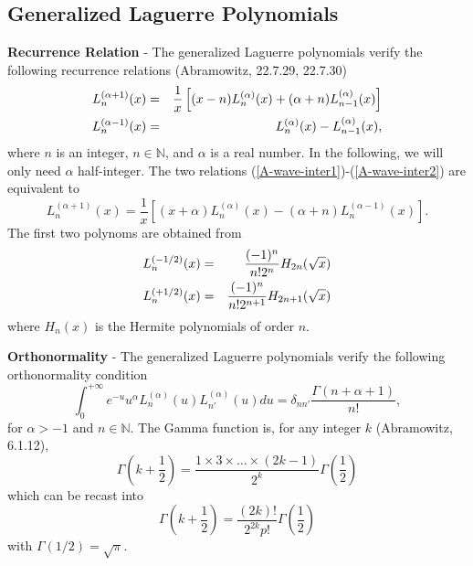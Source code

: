 \documentclass[letterpaper,12pt]{article}
\begin{document}
\subsection{Generalized Laguerre Polynomials}

{\bf Recurrence Relation} - The generalized Laguerre polynomials verify the
following recurrence relations (Abramowitz, 22.7.29, 22.7.30)
\begin{eqnarray}
\displaystyle L_{n}^{(\alpha +1)}(x) & = &
\frac{1}{x}\left[ (x-n)L_{n}^{(\alpha)}(x) + (\alpha+n)L_{n-1}^{(\alpha)}(x) 
           \right]
\label{A-wave-inter1}\medskip\\
\displaystyle L_{n}^{(\alpha-1)}(x) & = & L_{n}^{(\alpha)}(x) 
            - L_{n-1}^{(\alpha)}(x),
\label{A-wave-inter2}
\end{eqnarray} 
where $n$ is an integer, $n\in\mathbb{N}$, and $\alpha$ is a real number. In the
following, we will only need $\alpha$ half-integer. The two relations
(\ref{A-wave-inter1})-(\ref{A-wave-inter2}) are equivalent to
\begin{equation}
L_{n}^{(\alpha +1)}(x) = \frac{1}{x}\left[ (x+\alpha)L_{n}^{(\alpha)}(x) -
(\alpha+n)L_{n}^{(\alpha -1)}(x) \right].
\end{equation}
The first two polynoms are obtained from
\begin{eqnarray}
\displaystyle L_{n}^{(-1/2)}(x) & = &
\frac{(-1)^{n}}{n!2^{n}}H_{2n}(\sqrt{x})\medskip\\
\displaystyle L_{n}^{(+1/2)}(x) & = & 
              \frac{(-1)^{n}}{n!2^{n+1}}H_{2n+1}(\sqrt{x})
\end{eqnarray} 
where $H_{n}(x)$ is the Hermite polynomials of order $n$.

{\bf Orthonormality} - The generalized Laguerre polynomials verify the 
following orthonormality condition
\begin{equation}
\boxed{
\int_{0}^{+\infty}e^{-u}u^{\alpha} L_{n}^{(\alpha)}(u)L_{n'}^{(\alpha)}(u)du 
=
\delta_{nn'}\frac{\Gamma(n+\alpha+1)}{n!}},
\label{A-wave-ortho-lag}
\end{equation}
for $\alpha> -1$ and $n\in\mathbb{N}$. The Gamma function is, for any integer 
$k$ (Abramowitz, 6.1.12),
\begin{equation}
\Gamma\left(k + \frac{1}{2}\right) 
= 
\frac{1\times 3\times\dots\times (2k-1)}{2^{k}}\Gamma\left(\frac{1}{2}\right)
\end{equation}
which can be recast into
\begin{equation}
\Gamma\left(k + \frac{1}{2}\right) = \frac{(2k)!}{2^{2k}p!}
\Gamma\left(\frac{1}{2}\right)
\end{equation}
with $\Gamma(1/2) = \sqrt{\pi}$.
\end{document}
